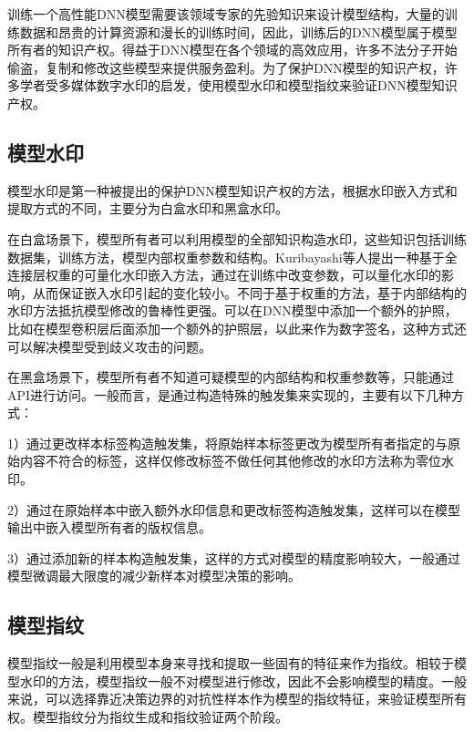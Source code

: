 训练一个高性能DNN模型需要该领域专家的先验知识来设计模型结构，大量的训练数据和昂贵的计算资源和漫长的训练时间，因此，训练后的DNN模型属于模型所有者的知识产权。得益于DNN模型在各个领域的高效应用，许多不法分子开始偷盗，复制和修改这些模型来提供服务盈利。为了保护DNN模型的知识产权\cite{JFYZ202205002,WXAQ202202001}，许多学者受多媒体数字水印的启发，使用模型水印和模型指纹来验证DNN模型知识产权。

\subsection{模型水印}

模型水印是第一种被提出的保护DNN模型知识产权的方法，根据水印嵌入方式和提取方式的不同，主要分为白盒水印和黑盒水印。

在白盒场景下，模型所有者可以利用模型的全部知识构造水印，这些知识包括训练数据集，训练方法，模型内部权重参数和结构。Kuribayashi等人\cite{kuribayashi2020deepwatermark}提出一种基于全连接层权重的可量化水印嵌入方法，通过在训练中改变参数，可以量化水印的影响，从而保证嵌入水印引起的变化较小。不同于基于权重的方法，基于内部结构的水印方法抵抗模型修改的鲁棒性更强。可以在DNN模型中添加一个额外的护照\cite{fan2019rethinking}，比如在模型卷积层后面添加一个额外的护照层，以此来作为数字签名，这种方式还可以解决模型受到歧义攻击的问题。

在黑盒场景下，模型所有者不知道可疑模型的内部结构和权重参数等，只能通过API进行访问。一般而言，是通过构造特殊的触发集来实现的，主要有以下几种方式：

1）通过更改样本标签构造触发集，将原始样本标签更改为模型所有者指定的与原始内容不符合的标签，这样仅修改标签不做任何其他修改的水印方法称为零位水印。

2）通过在原始样本中嵌入额外水印信息和更改标签构造触发集，这样可以在模型输出中嵌入模型所有者的版权信息。

3）通过添加新的样本构造触发集，这样的方式对模型的精度影响较大，一般通过模型微调最大限度的减少新样本对模型决策的影响。



\subsection{模型指纹}

模型指纹一般是利用模型本身来寻找和提取一些固有的特征来作为指纹。相较于模型水印的方法，模型指纹一般不对模型进行修改，因此不会影响模型的精度。一般来说，可以选择靠近决策边界的对抗性样本作为模型的指纹特征，来验证模型所有权。模型指纹分为指纹生成和指纹验证两个阶段。

